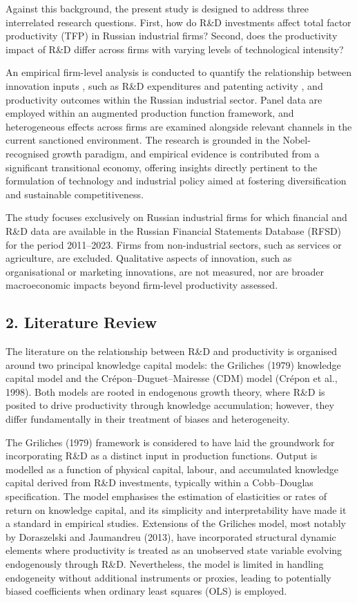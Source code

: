 \documentclass[a4paper, 12pt]{article}
\begin{document}
Against this background, the present study is designed to address three interrelated research questions. First, how do R\&D investments affect total factor productivity (TFP) in Russian industrial firms? Second, does the productivity impact of R\&D differ across firms with varying levels of technological intensity? 

An empirical firm-level analysis is conducted to quantify the relationship between innovation inputs , such as R\&D expenditures and patenting activity , and productivity outcomes within the Russian industrial sector. Panel data are employed within an augmented production function framework, and heterogeneous effects across firms are examined alongside relevant channels in the current sanctioned environment. The research is grounded in the Nobel-recognised growth paradigm, and empirical evidence is contributed from a significant transitional economy, offering insights directly pertinent to the formulation of technology and industrial policy aimed at fostering diversification and sustainable competitiveness.

The study focuses exclusively on Russian industrial firms for which financial and R\&D data are available in the Russian Financial Statements Database (RFSD) for the period 2011–2023. Firms from non-industrial sectors, such as services or agriculture, are excluded. Qualitative aspects of innovation, such as organisational or marketing innovations, are not measured, nor are broader macroeconomic impacts beyond firm-level productivity assessed.

\subsection{2. Literature Review}

The literature on the relationship between R\&D and productivity is organised around two principal knowledge capital models: the Griliches (1979) knowledge capital model and the Crépon–Duguet–Mairesse (CDM) model (Crépon et al., 1998). Both models are rooted in endogenous growth theory, where R\&D is posited to drive productivity through knowledge accumulation; however, they differ fundamentally in their treatment of biases and heterogeneity.

The Griliches (1979) framework is considered to have laid the groundwork for incorporating R\&D as a distinct input in production functions. Output is modelled as a function of physical capital, labour, and accumulated knowledge capital derived from R\&D investments, typically within a Cobb–Douglas specification. The model emphasises the estimation of elasticities or rates of return on knowledge capital, and its simplicity and interpretability have made it a standard in empirical studies. Extensions of the Griliches model, most notably by Doraszelski and Jaumandreu (2013), have incorporated structural dynamic elements where productivity is treated as an unobserved state variable evolving endogenously through R\&D. Nevertheless, the model is limited in handling endogeneity without additional instruments or proxies, leading to potentially biased coefficients when ordinary least squares (OLS) is employed.
\end{document}
